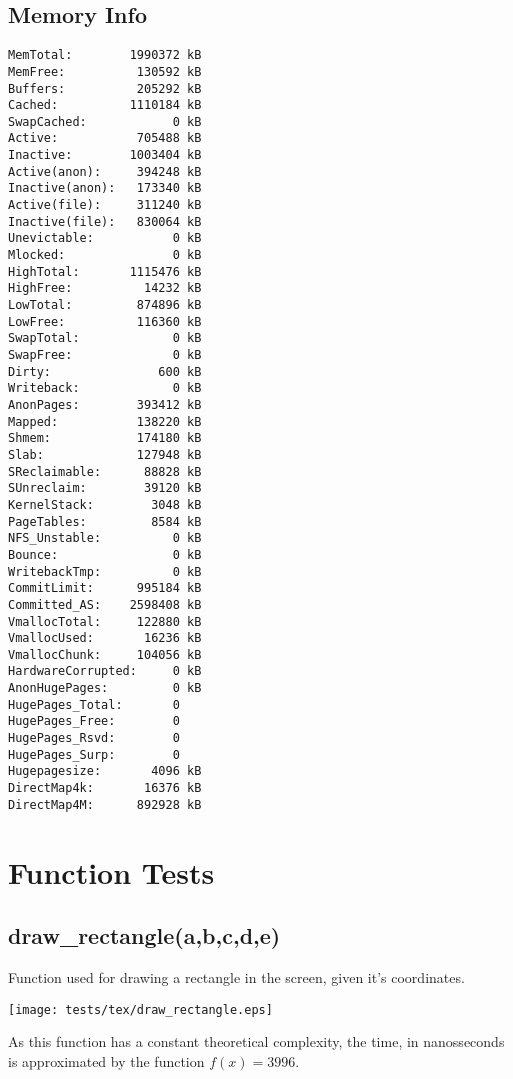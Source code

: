 \documentclass{article}
\begin{document}
\subsection{Memory Info}
\begin{verbatim}
MemTotal:        1990372 kB
MemFree:          130592 kB
Buffers:          205292 kB
Cached:          1110184 kB
SwapCached:            0 kB
Active:           705488 kB
Inactive:        1003404 kB
Active(anon):     394248 kB
Inactive(anon):   173340 kB
Active(file):     311240 kB
Inactive(file):   830064 kB
Unevictable:           0 kB
Mlocked:               0 kB
HighTotal:       1115476 kB
HighFree:          14232 kB
LowTotal:         874896 kB
LowFree:          116360 kB
SwapTotal:             0 kB
SwapFree:              0 kB
Dirty:               600 kB
Writeback:             0 kB
AnonPages:        393412 kB
Mapped:           138220 kB
Shmem:            174180 kB
Slab:             127948 kB
SReclaimable:      88828 kB
SUnreclaim:        39120 kB
KernelStack:        3048 kB
PageTables:         8584 kB
NFS_Unstable:          0 kB
Bounce:                0 kB
WritebackTmp:          0 kB
CommitLimit:      995184 kB
Committed_AS:    2598408 kB
VmallocTotal:     122880 kB
VmallocUsed:       16236 kB
VmallocChunk:     104056 kB
HardwareCorrupted:     0 kB
AnonHugePages:         0 kB
HugePages_Total:       0
HugePages_Free:        0
HugePages_Rsvd:        0
HugePages_Surp:        0
Hugepagesize:       4096 kB
DirectMap4k:       16376 kB
DirectMap4M:      892928 kB
\end{verbatim}
\section{Function Tests}
\subsection{draw\_rectangle(a,b,c,d,e)}
Function used for drawing a rectangle in the
screen, given it's coordinates. 

\texttt{[image: tests/tex/draw\_rectangle.eps]}

As this function has a constant theoretical
complexity, the time, in nanosseconds is 
approximated by the function $f(x)=3996$.
\end{document}
